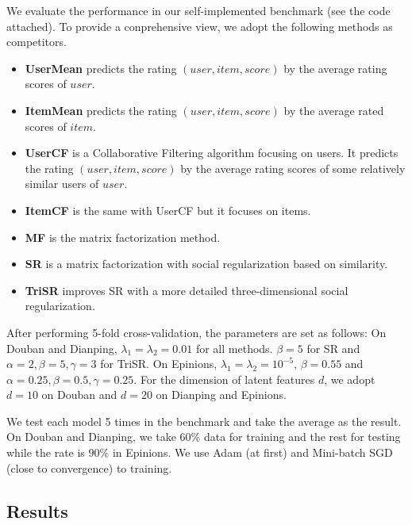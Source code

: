\documentclass{article}
\begin{document}
We evaluate the performance in our self-implemented benchmark (see the code attached). 
To provide a conprehensive view, we adopt the following methods as competitors.
\begin{itemize}
  \item \textbf{UserMean} predicts the rating $(user, item, score)$ by the average rating scores of $user$.
  \item \textbf{ItemMean} predicts the rating $(user, item, score)$ by the average rated scores of $item$.
  \item \textbf{UserCF} is a Collaborative Filtering algorithm focusing on users. 
  It predicts the rating $(user, item, score)$ by the average rating scores of 
  some relatively similar users of $user$.
  \item \textbf{ItemCF} \cite{Sarwar2001ItembasedCF} is the same with UserCF but it focuses on items.
  \item \textbf{MF} is the matrix factorization method.
  \item \textbf{SR} is a matrix factorization with social regularization based on similarity.
  \item \textbf{TriSR} improves SR with a more detailed three-dimensional social regularization.
\end{itemize}
After performing 5-fold cross-validation, the parameters are set as follows: 
On Douban and Dianping, $\lambda_1 = \lambda_2 = 0.01$ for all methods. $\beta = 5$ for SR and 
$\alpha=2, \beta=5, \gamma=3$ for TriSR. On Epinions, $\lambda_1 = \lambda_2 = 10^{-5}$, $\beta=0.55$ 
and $\alpha=0.25, \beta=0.5, \gamma=0.25$. For the dimension of latent 
features $d$, we adopt $d=10$ on Douban and $d=20$ on Dianping and Epinions. 

We test each model 5 times in the benchmark and take the average as the result. 
On Douban and Dianping, we take $60\%$ data for training and the rest for testing while 
the rate is $90\%$ in Epinions. We use Adam (at first) and Mini-batch SGD (close to convergence) to training.

\subsection{Results}
\end{document}
